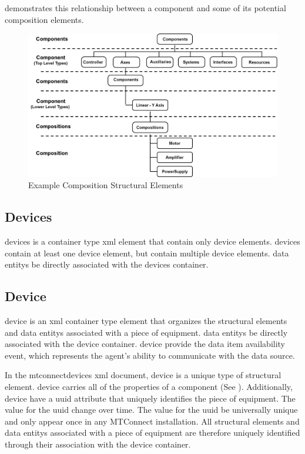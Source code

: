  demonstrates this relationship between a \gls{component} and some of its potential \gls{composition} elements.

\begin{figure}[ht]
  \centering
  \includegraphics[width=.70\textwidth]{figures/composition-structural-elements.png}
  \caption{Example Composition Structural Elements}
  \label{fig:composition-structural-elements}
\end{figure}

\FloatBarrier

\subsection{Devices}
\label{sec:Devices}

\gls{devices} is a container type \gls{xml} element that \MUST contain only \gls{device} elements. \gls{devices} \MUST contain at least one \gls{device} element, but \may contain multiple \gls{device} elements.  \glspl{data entity} \MAYNOT be directly associated with the \gls{devices} container.



\pagebreak

\subsection{Device}

\gls{device} is an \gls{xml} container type element that organizes the \glspl{structural element} and \glspl{data entity} associated with a piece of equipment.  \glspl{data entity} \may be directly associated with the \gls{device} container.  \gls{device} \MUST provide the data item \gls{availability event}, which represents the \gls{agent}'s ability to communicate with the data source.

In the \gls{mtconnectdevices} \gls{xml} document, \gls{device} is a unique type of \gls{structural element}.  \gls{device} carries all of the properties of a \gls{component} (See ).  Additionally, \gls{device} \MUST have a \gls{uuid} attribute that uniquely identifies the piece of equipment.  The value for the \gls{uuid} \SHOULDNOT change over time.  The value for the \gls{uuid} \MUST be universally unique and \MUST only appear once in any MTConnect installation.  All \glspl{structural element} and \glspl{data entity} associated with a piece of equipment are therefore uniquely identified through their association with the \gls{device} container.

